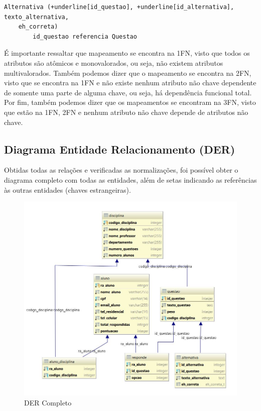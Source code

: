 \documentclass[12pt,a4paper]{article}
\begin{document}
\begin{Verbatim}[commandchars=+\[\]]
    Alternativa (+underline[id_questao], +underline[id_alternativa], texto_alternativa, 
    eh_correta)
        id_questao referencia Questao
\end{Verbatim}


É importante ressaltar que mapeamento se encontra na 1FN, visto que todos os atributos são atômicos e monovalorados, ou seja, não existem atributos multivalorados. Também podemos dizer que o mapeamento se encontra na 2FN, visto que se encontra na 1FN e não existe nenhum atributo não chave dependente de somente uma parte de alguma chave, ou seja, há dependência funcional total.\\

Por fim, também podemos dizer que os mapeamentos se encontram na 3FN, visto que estão na 1FN, 2FN e nenhum atributo não chave depende de atributos não chave.

\subsection{Diagrama Entidade Relacionamento (DER)}

Obtidas todas as relações e verificadas as normalizações, foi possível obter o diagrama completo com todas as entidades, além de setas indicando as referências às outras entidades (chaves estrangeiras).

\begin{center}
\begin{figure}[h]
    \centering
    \includegraphics[width=\linewidth]{mapeamento.jpg}
    \caption{DER Completo}
    \label{fig:DERcompleto}
\end{figure}
\end{center}
\end{document}
